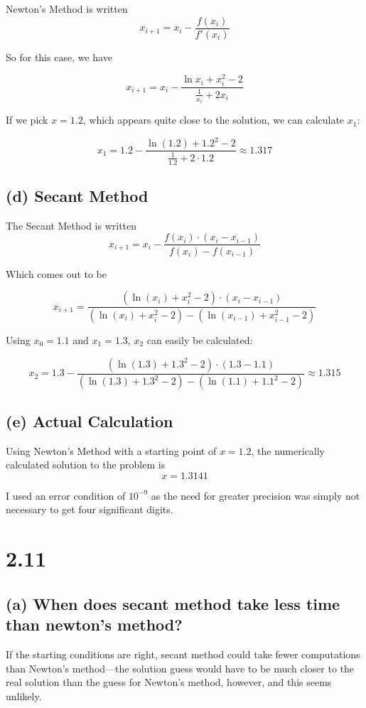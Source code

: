 \documentclass{article}[12pt]
\begin{document}
Newton's Method is written $$x_{i+1} = x_i - \frac{f(x_i)}{f'(x_i)}$$

So for this case, we have

$$x_{i+1} = x_i - \frac{\ln x_i + x_i^2 - 2}{\frac{1}{x_i} + 2x_i}$$

If we pick $x = 1.2$, which appears quite close to the solution, we can calculate $x_1$:

$$x_1 = 1.2 - \frac{\ln(1.2) + 1.2^2 - 2}{\frac{1}{1.2} + 2\cdot 1.2} \approx 1.317$$

\subsection*{(d) \normalsize Secant Method}

The Secant Method is written $$x_{i+1} = x_i - \frac{f(x_i)\cdot (x_i - x_{i-1})}{f(x_i) - f(x_{i-1})}$$

Which comes out to be 

$$x_{i+1} = \frac{(\ln(x_i)+x_i^2-2)\cdot (x_i - x_{i-1})}{(\ln(x_i) + x_i^2 - 2) - (\ln(x_{i-1}) + x_{i-1}^2 -2)}$$

Using $x_0 = 1.1$ and $x_1 = 1.3$, $x_2$ can easily be calculated:

$$x_2 = 1.3 - \frac{(\ln(1.3) + 1.3^2 -2)\cdot (1.3-1.1)}{(\ln(1.3) + 1.3^2 -2)-(\ln(1.1) + 1.1^2 -2)} \approx 1.315$$

\subsection*{(e) \normalsize Actual Calculation}

Using Newton's Method with a starting point of $x = 1.2$, the numerically calculated solution to the problem is $$x = 1.3141$$

I used an error condition of $10^{-9}$ as the need for greater precision was simply not necessary to get four significant digits.

\section*{2.11}

\subsection*{(a) \normalsize When does secant method take less time than newton's method?}

If the starting conditions are right, secant method could take fewer computations than Newton's method---the solution guess would have to be much closer to the real solution than the guess for Newton's method, however, and this seems unlikely.
\end{document}
